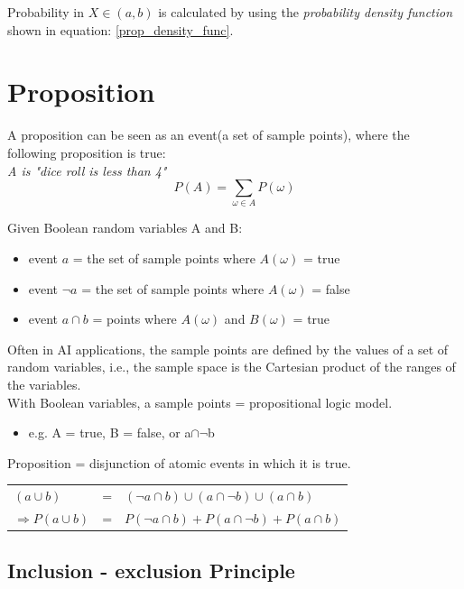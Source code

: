 Probability in $X \in (a,b)$ is calculated by using the \textit{probability density function} shown in equation: \ref{prop_density_func}.

\section{Proposition}
A proposition can be seen as an event(a set of sample points), where the following proposition is true:\\
\textit{A is "dice roll is less than 4"}\\

\begin{equation}
P(A) = \sum_{\omega \in A} P(\omega)
\end{equation}

Given Boolean random variables A and B:
\begin{itemize}
\item event $a$ = the set of sample points where $A(\omega)$ = true
\item event $\neg a$ = the set of sample points where $A(\omega)$ = false
\item event $a \cap b$ = points where $A(\omega)$ and $B(\omega)$ = true
\end{itemize}

Often in AI applications, the sample points are defined by the values of a set of random variables, i.e., the sample space is the Cartesian product of the ranges of the variables.\\
With Boolean variables, a sample points = propositional logic model.\\
\begin{itemize}
\item e.g. A = true, B = false, or a$\cap \neg$b
\end{itemize}

Proposition = disjunction of atomic events in which it is true.\\
\begin{table}[h]
\centering
\begin{tabular}{l l l}
$(a \cup b)$ & = & $(\neg a \cap b) \cup (a \cap \neg b) \cup (a \cap b)$ \\
$\Rightarrow P(a \cup b)$ & = & $P(\neg a \cap b) + P(a \cap \neg b) + P(a \cap b)$
\end{tabular}
\end{table}


\subsection{Inclusion - exclusion Principle}

